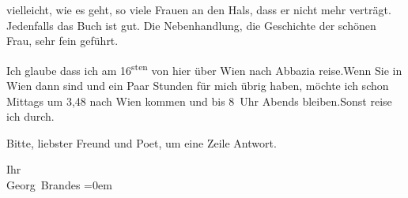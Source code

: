                vielleicht, wie es geht, so viele Frauen an den Hals, dass er nicht mehr verträgt.
               Jedenfalls {\pb}das Buch ist gut. Die Nebenhandlung, die
               Geschichte der schönen Frau, sehr fein geführt.\pend
           
\pstart
           Ich glaube dass ich am 16\textsuperscript{sten} von hier über Wien nach Abbazia reise.\hspace*{1.5em}Wenn Sie in Wien dann sind und ein Paar Stunden
               für mich übrig haben, möchte ich schon Mittags um 3,48 nach Wien kommen und bis 8 Uhr Abends
                  bleiben.\hspace*{1.5em}Sonst reise ich durch.\pend
           
\pstart
           Bitte, liebster Freund und Poet, um eine Zeile Antwort.\pend
           
\pstart
           Ihr{\\[\baselineskip]}\spacefill\mbox{Georg Brandes}\pend
           \leftskip=0em{}\endnumbering{}  \newcommand{\dateiname}{L01116}\newcommand{\titel}{Georg Brandes an Arthur Schnitzler, 10. 5. [1901]}\newcommand{\editorInnen}{Martin Anton Müller und Gerd-Hermann Susen}

